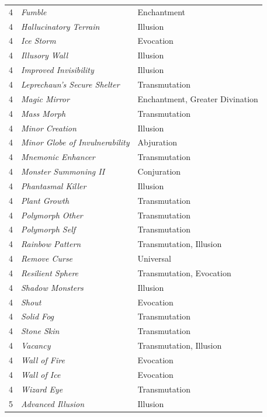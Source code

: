 \begin{multicols}{2}
\begin{tabular}{|p{}|p{}|p{}|}
4	& \textit{Fumble}	& Enchantment \\
\rowcolor[gray]{.9}4	& \textit{Hallucinatory Terrain}	& Illusion \\
4	& \textit{Ice Storm}	& Evocation \\
\rowcolor[gray]{.9}4	& \textit{Illusory Wall}	& Illusion \\
4	& \textit{Improved Invisibility}	& Illusion \\
\rowcolor[gray]{.9}4	& \textit{Leprechaun's Secure Shelter}	& Transmutation \\
4	& \textit{Magic Mirror}	& Enchantment, Greater Divination \\
\rowcolor[gray]{.9}4	& \textit{Mass Morph}	& Transmutation \\
4	& \textit{Minor Creation}	& Illusion \\
\rowcolor[gray]{.9}4	& \textit{Minor Globe of Invulnerability}	& Abjuration \\
4	& \textit{Mnemonic Enhancer}	& Transmutation \\
\rowcolor[gray]{.9}4	& \textit{Monster Summoning II}	& Conjuration \\
4	& \textit{Phantasmal Killer}	& Illusion \\
\rowcolor[gray]{.9}4	& \textit{Plant Growth}	& Transmutation \\
4	& \textit{Polymorph Other}	& Transmutation \\
\rowcolor[gray]{.9}4	& \textit{Polymorph Self}	& Transmutation \\
4	& \textit{Rainbow Pattern}	& Transmutation, Illusion \\
\rowcolor[gray]{.9}4	& \textit{Remove Curse}	& Universal \\
4	& \textit{Resilient Sphere}	& Transmutation, Evocation \\
\rowcolor[gray]{.9}4	& \textit{Shadow Monsters}	& Illusion \\
4	& \textit{Shout}	& Evocation \\
\rowcolor[gray]{.9}4	& \textit{Solid Fog}	& Transmutation \\
4	& \textit{Stone Skin}	& Transmutation \\
\rowcolor[gray]{.9}4	& \textit{Vacancy}	& Transmutation, Illusion \\
4	& \textit{Wall of Fire}	& Evocation \\
\rowcolor[gray]{.9}4	& \textit{Wall of Ice}	& Evocation \\
4	& \textit{Wizard Eye}	& Transmutation \\
\rowcolor[gray]{.9}5	& \textit{Advanced Illusion}	& Illusion \\

\end{tabular}
\end{multicols}
